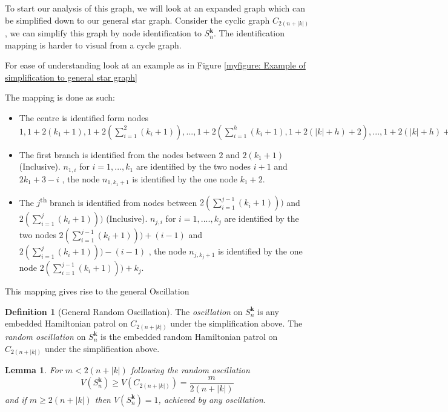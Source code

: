 \documentclass[a4paper,10pt]{article}
\newtheorem{lemma}[theorem]{Lemma}
\theoremstyle{definition}
\newtheorem{definition}[theorem]{Definition}
\theoremstyle{definition}
\theoremstyle{remark}
\theoremstyle{definition}
\begin{document}
To start our analysis of this graph, we will look at an expanded graph which can be simplified down to our general star graph. Consider the cyclic graph $C_{2(n+|k|)}$ , we can simplify this graph by node identification to $S^{\bm{k}}_{n}$. The identification mapping is harder to visual from a cycle graph.

For ease of understanding look at an example as in Figure \ref{myfigure: Example of simplification to general star graph}

The mapping is done as such:
\begin{itemize}
\item The centre is identified form nodes $1,1+2(k_{1}+1),1+2(\sum\limits_{i=1}^{2} (k_{i}+1)),...,1+2(\sum\limits_{i=1}^{h}(k_{i}+1),1+2(|k|+h)+2),...,1+2(|k|+h)+2(n-h)$

\item The first branch is identified from the nodes between $2$ and $2(k_{1}+1)$ (Inclusive). $n_{1,i}$ for $i=1,...,k_{1}$ are identified by the two nodes $i+1$ and $2k_{1}+3-i$ , the node $n_{1,k_{1}+1}$ is identified by the one node $k_{1}+2$.

\item The $j$\textsuperscript{th} branch is identified from nodes between $2(\sum\limits_{i=1}^{j-1} (k_{i}+1)))$ and $2(\sum\limits_{i=1}^{j} (k_{i}+1)))$ (Inclusive). $n_{j,i}$ for $i=1,....,k_{j}$ are identified by the two nodes $2(\sum\limits_{i=1}^{j-1} (k_{i}+1)))+(i-1)$ and $2(\sum\limits_{i=1}^{j} (k_{i}+1)))-(i-1)$ , the node $n_{j,k_{j}+1}$ is identified by the one node $2(\sum\limits_{i=1}^{j-1} (k_{i}+1)))+k_{j}$.
\end{itemize}

This mapping gives rise to the general Oscillation

\begin{definition}[General Random Oscillation]
The \textit{oscillation} on $S^{\bm{k}}_{n}$ is any embedded Hamiltonian patrol on $C_{2(n+|k|)}$ under the simplification above. The \textit{random oscillation} on $S^{\bm{k}}_{n}$ is the embedded random Hamiltonian patrol on $C_{2(n+|k|)}$ under the simplification above.
\end{definition}

\begin{lemma}
For $m < 2(n+|k|)$ following the random oscillation
$$V(S^{\bm{k}}_{n}) \geq V(C_{2(n+|k|)})=\frac{m}{2(n+|k|)}$$
and if $m \geq 2(n+|k|)$ then $V(S^{\bm{k}}_{n})=1$, achieved by any oscillation. 
\end{lemma}
\end{document}
